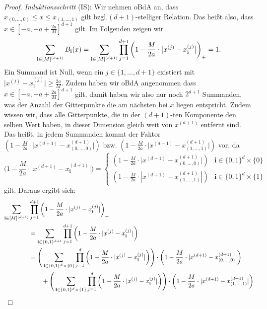 \begin{proof}
\emph{Induktionsschritt} (IS): Wir nehmen oBdA an, dass $x_{(0,\dots,0)} \leq x \leq x_{(1,\dots,1)}$ gilt bzgl.\@ $(d+1)$-stelliger Relation. Das heißt also, dass $x \in [-a, -a + \frac{2a}{M}]^{d + 1}$ gilt. Im Folgenden zeigen wir $$\sum_{\mathbf{i} \in [M]^{(d + 1)}} B_{\mathbf{i}}(x) = \sum_{\mathbf{i} \in [M]^{(d + 1)}}\prod_{j = 1}^{d + 1} \bigg(1 - \frac{M}{2a} \cdot \big|x^{(j)} - x_{\mathbf{i}}^{(j)}\big|\bigg)_+ = 1.$$
Ein Summand ist Null, wenn ein $j \in \{1,\dots,d+1\}$ existiert mit $\big|x^{(j)} - x_{\mathbf{i}}^{(j)}\big| \geq \frac{2a}{M}$. Zudem haben wir oBdA angenommen dass $x \in [-a, -a + \frac{2a}{M}]^{d + 1}$ gilt, damit haben wir also nur noch $2^{d + 1}$ Summanden, was der Anzahl der Gitterpunkte die am nächsten bei $x$ liegen entspricht. Zudem wissen wir, dass alle Gitterpunkte, die in der $(d + 1)$-ten Komponente den selben Wert haben, in dieser Dimension gleich weit von $x^{(d + 1)}$ entfernt sind. Das heißt, in jedem Summanden kommt der Faktor $(1 - \frac{M}{2a} \cdot \big|x^{(d + 1)} - x_{(0,\dots,0)}^{(d + 1)}\big|)$ bzw. $(1 - \frac{M}{2a} \cdot \big|x^{(d + 1)} - x_{(1,\dots,1)}^{(d + 1)}\big|)$ vor, da 
\begin{equation*}
\bigg(1 - \frac{M}{2a} \cdot \Big|x^{(d + 1)} - x_\mathbf{i}^{(d + 1)}\Big|\bigg) = \begin{cases}
(1 - \frac{M}{2a} \cdot \big|x^{(d + 1)} - x_{(0,\dots,0)}^{(d + 1)}\big|) &\text{$\mathbf{i} \in \{0, 1\}^d \times \{0\}$}\\
(1 - \frac{M}{2a} \cdot |x^{(d + 1)} - x_{(1,\dots,1)}^{(d + 1)}|) &\text{$\mathbf{i} \in \{0, 1\}^d \times \{1\}$}
\end{cases}
\end{equation*}
gilt. Daraus ergibt sich:
\begin{equation*}
\begin{split}
\sum_{\bi \in [M]^{(d + 1)}} & \prod_{j = 1}^{d + 1} \bigg(1 - \frac{M}{2a} \cdot |x^{(j)} - x_{\mathbf{i}}^{(j)}|\bigg)_+ \\
& = \sum_{\mathbf{i} \in \{0, 1\}^{d + 1}} \prod_{j = 1}^{d + 1} \bigg(1 - \frac{M}{2a} \cdot |x^{(j)} - x_{\bi}^{(j)}|\bigg) \\
& = \Bigg(\sum_{\mathbf{i} \in \{0, 1\}^d \times \{0\}} \prod_{j = 1}^{d} \bigg(1 - \frac{M}{2a} \cdot |x^{(j)} - x_{\bi}^{(j)}|\bigg)\Bigg) \cdot \bigg(1 - \frac{M}{2a} \cdot |x^{(d + 1)} - x_{(0,\dots,0)}^{(d + 1)}|\bigg) \\
& \qquad + \Bigg(\sum_{\mathbf{i} \in \{0, 1\}^d \times \{1\}} \prod_{j = 1}^{d} \bigg(1 - \frac{M}{2a} \cdot |x^{(j)} - x_{\bi}^{(j)}|\bigg)\Bigg) \cdot \bigg(1 - \frac{M}{2a} \cdot |x^{(d + 1)} - x_{(1,\dots,1)}^{(d + 1)}|\bigg) \\

\end{split}
\end{equation*}
\end{proof}
